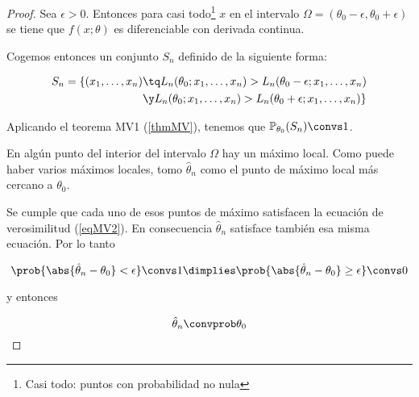 \documentclass{apuntes}
\begin{document}
\begin{proof}
Sea $\epsilon > 0$. Entonces para casi todo\footnote{Casi todo: puntos con probabilidad no nula} $x$ en el intervalo $\Omega = (\theta_0 - \epsilon, \theta_0 + \epsilon)$ se tiene que $f(x;\theta)$ es diferenciable con derivada continua.

\begin{center}
\end{center}

Cogemos entonces un conjunto $S_n$ definido de la siguiente forma:

\begin{align*}
S_n = \{ (x_1,\dotsc,x_n) &\tq L_n(\theta_0;x_1, \dotsc,x_n) > L_n(\theta_0 - \epsilon; x_1, \dotsc, x_n) \\
&\y  L_n(\theta_0;x_1, \dotsc,x_n) > L_n(\theta_0 + \epsilon; x_1, \dotsc, x_n) \}
\end{align*}

Aplicando el teorema MV1 (\ref{thmMV}), tenemos que $\mathbb{P}_{\theta_0}(S_n) \convs 1$.

En algún punto del interior del intervalo $\Omega$ hay un máximo local. Como puede haber varios máximos locales, tomo $\hat\theta_n$ como el punto de máximo local más cercano a $\theta_0$.

Se cumple que cada uno de esos puntos de máximo satisfacen la ecuación de verosimilitud (\ref{eqMV2}). En consecuencia $\hat\theta_n$ satisface también esa misma ecuación. Por lo tanto

\[ \prob{\abs{\hat\theta_n - \theta_0} < \epsilon} \convs 1 \dimplies \prob{\abs{\hat\theta_n - \theta_0} \geq \epsilon} \convs 0 \]

y entonces

\[ \hat\theta_n \convprob \theta_0 \]
\end{proof}
\end{document}
